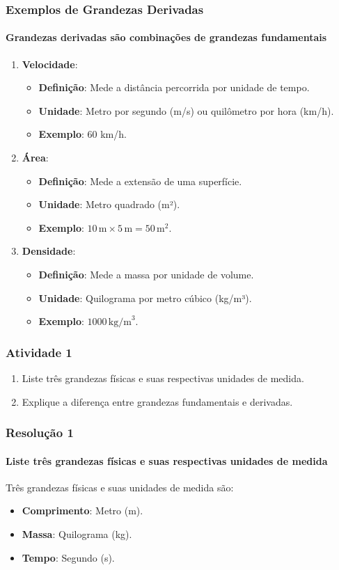 \documentclass[12pt]{beamer}
\begin{document}
\begin{frame}
\frametitle{Exemplos de Grandezas Derivadas}
\framesubtitle{Grandezas derivadas são combinações de grandezas fundamentais}

\begin{enumerate}
    \item \textbf{Velocidade}:
    \begin{itemize}
        \item \textbf{Definição}: Mede a distância percorrida por unidade de tempo.
        \item \textbf{Unidade}: Metro por segundo (m/s) ou quilômetro por hora (km/h).
        \item \textbf{Exemplo}: 60 km/h.
    \end{itemize}

    \item \textbf{Área}:
    \begin{itemize}
        \item \textbf{Definição}: Mede a extensão de uma superfície.
        \item \textbf{Unidade}: Metro quadrado (m²).
        \item \textbf{Exemplo}: \( 10 \, \text{m} \times 5 \, \text{m} = 50 \, \text{m}^2 \).
    \end{itemize}

    \item \textbf{Densidade}:
    \begin{itemize}
        \item \textbf{Definição}: Mede a massa por unidade de volume.
        \item \textbf{Unidade}: Quilograma por metro cúbico (kg/m³).
        \item \textbf{Exemplo}: \( 1000 \, \text{kg/m}^3 \).
    \end{itemize}
\end{enumerate}
\end{frame}

\begin{frame}
    \frametitle{Atividade 1}
    \begin{enumerate}
        \item Liste três grandezas físicas e suas respectivas unidades de medida.
        \item Explique a diferença entre grandezas fundamentais e derivadas.
    \end{enumerate}
\end{frame}
\begin{frame}
\frametitle{Resolução 1}
\framesubtitle{Liste três grandezas físicas e suas respectivas unidades de medida}

Três grandezas físicas e suas unidades de medida são:
\begin{itemize}
    \item \textbf{Comprimento}: Metro (m).
    \item \textbf{Massa}: Quilograma (kg).
    \item \textbf{Tempo}: Segundo (s).
\end{itemize}
\end{frame}
\end{document}

